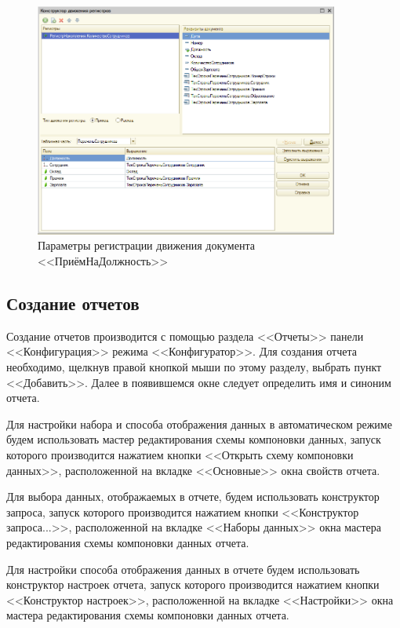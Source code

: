 \begin{figure}[h!]
  \centering
  \includegraphics[width=100mm]{pic/register_document_drive}
  \caption{Параметры регистрации движения документа <<ПриёмНаДолжность>>}
  \label{fig:register_document_drive}
\end{figure}

\pagebreak


\subsection{Создание отчетов}

Создание отчетов производится с помощью раздела
<<Отчеты>> панели <<Конфигурация>> режима <<Конфигуратор>>.
Для создания отчета необходимо,
щелкнув правой кнопкой мыши по этому
разделу, выбрать пункт <<Добавить>>. Далее в появившемся окне
следует определить имя и синоним отчета.

Для настройки набора и способа отображения данных в
автоматическом режиме будем использовать
мастер редактирования схемы компоновки данных,
запуск которого производится нажатием кнопки
<<Открыть схему компоновки данных>>, расположенной
на вкладке <<Основные>> окна свойств отчета.

Для выбора данных, отображаемых в отчете, будем использовать
конструктор запроса, запуск которого производится нажатием кнопки
<<Конструктор запроса...>>, расположенной
на вкладке <<Наборы данных>> окна
мастера редактирования схемы компоновки данных отчета.

Для настройки способа отображения данных в отчете будем использовать
конструктор настроек отчета, запуск которого производится нажатием кнопки
<<Конструктор настроек>>, расположенной
на вкладке <<Настройки>> окна
мастера редактирования схемы компоновки данных отчета.

